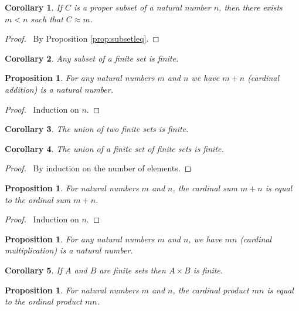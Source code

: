 \documentclass{book}
\let\qed\relax
\newtheorem{prop}[ax]{Proposition}
\newtheorem{cor}{Corollary}[ax]
\theoremstyle{definition}
\begin{document}
\begin{cor}
If $C$ is a proper subset of a natural number $n$, then there exists $m < n$ such that $C \approx m$.
\end{cor}

\begin{proof}
\pf\ By Proposition \ref{prop:subsetleq}. \qed
\end{proof}

\begin{cor}
Any subset of a finite set is finite.
\end{cor}

\begin{prop}
For any natural numbers $m$ and $n$ we have $m+n$ (cardinal addition) is a natural number.
\end{prop}

\begin{proof}
\pf\ Induction on $n$. \qed
\end{proof}

\begin{cor}
The union of two finite sets is finite.
\end{cor}

\begin{cor}
\label{cor:finiteunion}
The union of a finite set of finite sets is finite.
\end{cor}

\begin{proof}
\pf\ By induction on the number of elements. \qed
\end{proof}

\begin{prop}
For natural numbers $m$ and $n$, the cardinal sum $m + n$ is equal to the ordinal sum $m + n$.
\end{prop}

\begin{proof}
\pf\ Induction on $n$. \qed
\end{proof}

\begin{prop}
For any natural numbers $m$ and $n$, we have $mn$ (cardinal multiplication) is a natural number.
\end{prop}

\begin{cor}
If $A$ and $B$ are finite sets then $A \times B$ is finite.
\end{cor}

\begin{prop}
For natural numbers $m$ and $n$, the cardinal product $mn$ is equal to the ordinal product $mn$.
\end{prop}
\end{document}

